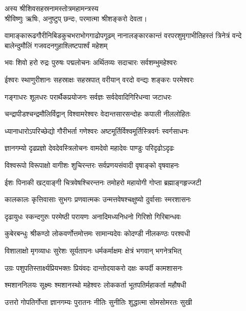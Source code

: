 अस्य श्रीशिवसहस्रनामस्तोत्रमहामन्त्रस्य \textsf{}\\
श्रीविष्णुः ऋषिः, अनुष्टुप् छन्दः, परमात्मा श्रीशङ्करो देवता।


{वामाङ्कारूढगौरीनिबिडकुचभराभोगगाढोपगूढम्}
{नानालङ्कारकान्तं वरपरशुमृगाभीतिहस्तं त्रिनेत्रं}
{वन्दे बालेन्दुमौलिं गजवदनगुहाश्लिष्टपार्श्वं महेशम्}

\resetShloka
{}

\twolineshloka
{भवः शिवो हरो रुद्रः पुरुषः पद्मलोचनः}
{अर्थितव्यः सदाचारः सर्वशम्भुमहेश्वरः}

\twolineshloka
{ईश्वरः स्थाणुरीशानः सहस्राक्षः सहस्रपात्}
{वरीयान् वरदो वन्द्यः शङ्करः परमेश्वरः}

\twolineshloka
{गङ्गाधरः शूलधरः परार्थैकप्रयोजनः}
{सर्वज्ञः सर्वदेवादिगिरिधन्वा जटाधरः}

\twolineshloka
{चन्द्रापीडश्चन्द्रमौलिर्विद्वान् विश्वामरेश्वरः}
{वेदान्तसारसन्दोहः कपाली नीललोहितः}

\twolineshloka
{ध्यानाधारोऽपरिच्छेद्यो गौरीभर्ता गणेश्वरः}
{अष्टमूर्तिर्विश्वमूर्तिस्त्रिवर्गः स्वर्गसाधनः}

\twolineshloka
{ज्ञानगम्यो दृढप्रज्ञो देवदेवस्त्रिलोचनः}
{वामदेवो महादेवः पाण्डुः परिदृढोऽदृढः}

\twolineshloka
{विश्वरूपो विरूपाक्षो वागीशः शुचिरन्तरः}
{सर्वप्रणयसंवादी वृषाङ्को वृषवाहनः}

\twolineshloka
{ईशः पिनाकी खट्वाङ्गी चित्रवेषश्चिरन्तनः}
{तमोहरो महायोगी गोप्ता ब्रह्माङ्गहृज्जटी}

\twolineshloka
{कालकालः कृत्तिवासाः सुभगः प्रणवात्मकः}
{उन्मत्तवेषश्चक्षुष्यो दुर्वासाः स्मरशासनः}

\twolineshloka
{दृढायुधः स्कन्दगुरुः परमेष्ठी परायणः}
{अनादिमध्यनिधनो गिरिशो गिरिबान्धवः}

\twolineshloka
{कुबेरबन्धुः श्रीकण्ठो लोकवर्णोत्तमोत्तमः}
{सामान्यदेवः कोदण्डी नीलकण्ठः परश्वधी}

\twolineshloka
{विशालाक्षो मृगव्याधः सुरेशः सूर्यतापनः}
{धर्मकर्माक्षमः क्षेत्रं भगवान् भगनेत्रभित्}

\twolineshloka
{उग्रः पशुपतिस्तार्क्ष्यप्रियभक्तः प्रियंवदः}
{दान्तोदयाकरो दक्षः कपर्दी कामशासनः}

\twolineshloka
{श्मशाननिलयः सूक्ष्मः श्मशानस्थो महेश्वरः}
{लोककर्ता भूतपतिर्महाकर्ता महौषधी}

\twolineshloka
{उत्तरो गोपतिर्गोप्ता ज्ञानगम्यः पुरातनः}
{नीतिः सुनीतिः शुद्धात्मा सोमसोमरतः सुखी}

